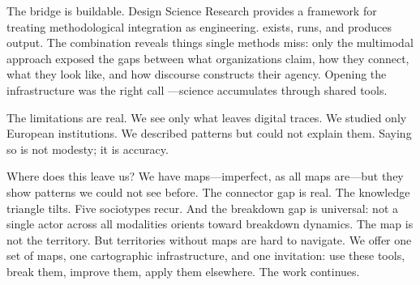 \documentclass[../main.tex]{subfiles}
\begin{document}
The bridge is buildable. Design Science Research \cite{simon1996sciences,gregor2013positioning} provides a framework for treating methodological integration as engineering. \RoleBox{} exists, runs, and produces output. The combination reveals things single methods miss: only the multimodal approach exposed the gaps between what organizations claim, how they connect, what they look like, and how discourse constructs their agency. Opening the infrastructure was the right call \cite{salganik2019bitbybit}---science accumulates through shared tools.

The limitations are real. We see only what leaves digital traces. We studied only European institutions. We described patterns but could not explain them. Saying so is not modesty; it is accuracy.

Where does this leave us? We have maps---imperfect, as all maps are---but they show patterns we could not see before. The connector gap is real. The knowledge triangle tilts. Five sociotypes recur. And the breakdown gap is universal: not a single actor across all modalities orients toward breakdown dynamics. The map is not the territory. But territories without maps are hard to navigate. We offer one set of maps, one cartographic infrastructure, and one invitation: use these tools, break them, improve them, apply them elsewhere. The work continues.
\end{document}
